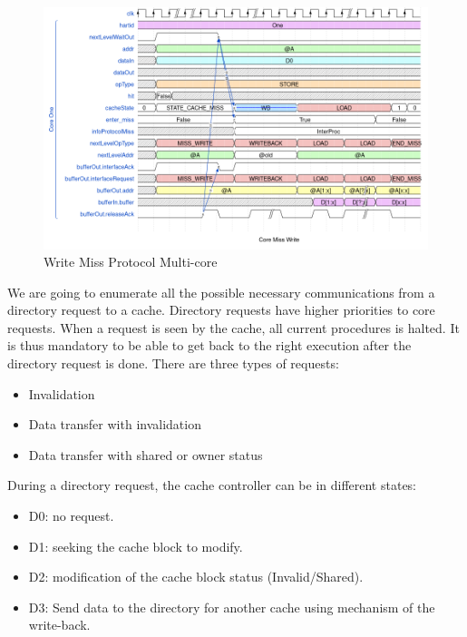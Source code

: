 \documentclass[10pt,letterpaper]{article}
\begin{document}
\begin{figure}[H]
\centering
\includegraphics[width=15cm]{img/multi_proc/multicore_miss_write.png}
\caption{Write Miss Protocol Multi-core}
\label{fig:wm_multicore}
\end{figure}

\noindent We are going to enumerate all the possible necessary communications from a directory request to a cache. Directory requests have higher priorities to core requests. When a request is seen by the cache, all current procedures is halted. It is thus mandatory to be able to get back to the right execution after the directory request is done. There are three types of requests:

\begin{itemize}
    \item Invalidation
    \item Data transfer with invalidation
    \item Data transfer with shared or owner status
\end{itemize}

\noindent During a directory request, the cache controller can be in different states:

\begin{itemize}
    \item D0: no request.
    \item D1: seeking the cache block to modify.
    \item D2: modification of the cache block status (Invalid/Shared).
    \item D3: Send data to the directory for another cache using mechanism of the write-back.
\end{itemize}
\end{document}
